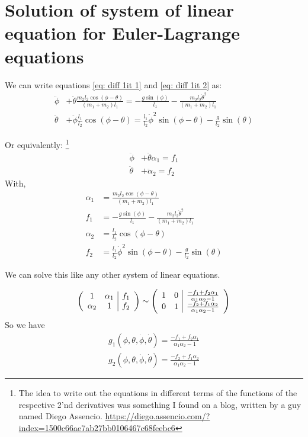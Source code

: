 \documentclass[twocolumn]{revtex4-2}
\begin{document}
\section{Solution of system of linear equation for Euler-Lagrange equations }
\label{ap: lin eq}
We can write equations \ref{eq: diff 1it 1} and \ref{eq: diff 1it 2} as:
\begin{align}
	\ddot \phi& + \ddot \theta \frac{m_2l_2\cos{(\phi -\theta)}}{(m_1 + m_2)l_1} = -\frac{g\sin{(\phi)}}{l_1} - \frac{m_2 l_2 \dot \theta^{2} }{(m_1 + m_2)l_1} \\
	\ddot \theta& + \ddot \phi \frac{l_1}{l_2}\cos{(\phi - \theta)} = \frac{l_1}{l_2}\dot \phi^2\sin{(\phi - \theta)} - \frac{g}{l_2}\sin{(\theta)}
\end{align}

Or equivalently: \footnote{The idea to write out the equations in different terms of the functions of 
the respective 2'nd derivatives was something I found on a blog, written by a guy named Diego Assencio. \url{https://diego.assencio.com/?index=1500c66ae7ab27bb0106467c68feebc6}}
\begin{align}
	\ddot \phi & + \ddot \theta \alpha_1 = f_1 \\
	\ddot \theta & + \ddot \alpha_2 = f_2
\end{align}
With, 
\begin{align}
	\alpha_1 &= \frac{m_2l_2\cos{(\phi -\theta)}}{(m_1 + m_2)l_1} \\
	f_1 &= -\frac{g\sin{(\phi)}}{l_1} - \frac{m_2 l_2 \dot \theta^{2} }{(m_1 + m_2)l_1} \\
	\alpha_2 &= \frac{l_1}{l_2}\cos{(\phi - \theta)} \\
	f_2 &= \frac{l_1}{l_2}\dot \phi^2\sin{(\phi - \theta)} - \frac{g}{l_2}\sin{(\theta)}
\end{align}

We can solve this like any other system of linear equations.

\begin{equation}
\left(\begin{array}{c c | c}
1 & \alpha_1 & f_1 \\
\alpha_2 & 1 & f_2
\end{array}\right) \sim
\left(\begin{array}{c c | c}
1 & 0 & \frac{-f_1+f_2\alpha_1}{\alpha_1\alpha_2-1} \\
0 & 1 & \frac{-f_2+f_1\alpha_2}{\alpha_1\alpha_2-1}
\end{array}\right)
\end{equation}
So we have 
\begin{align}
	g_1(\phi, \theta,\dot \phi,\dot \theta) = \frac{-f_1+f_2\alpha_1}{\alpha_1\alpha_2-1} \\
	g_2(\phi, \theta,\dot \phi,\dot \theta) = \frac{-f_2+f_1\alpha_2}{\alpha_1\alpha_2-1}
\end{align}

\end{document}
